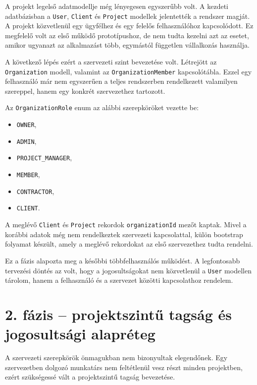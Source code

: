 \documentclass[11pt,a4paper]{report}
\begin{document}
    A projekt legelső adatmodellje még lényegesen egyszerűbb volt. A kezdeti
    adatbázisban a \texttt{User}, \texttt{Client} és \texttt{Project} modellek
    jelentették a rendszer magját. A projekt közvetlenül egy ügyfélhez és egy
    felelős felhasználóhoz kapcsolódott. Ez megfelelő volt az első működő
    prototípushoz, de nem tudta kezelni azt az esetet, amikor ugyanazt az
    alkalmazást több, egymástól független vállalkozás használja.

    A következő lépés ezért a szervezeti szint bevezetése volt. Létrejött az
    \texttt{Organization} modell, valamint az \texttt{OrganizationMember}
    kapcsolótábla. Ezzel egy felhasználó már nem egyszerűen a teljes rendszerben
    rendelkezett valamilyen szereppel, hanem egy konkrét szervezethez tartozott.

    Az \texttt{OrganizationRole} enum az alábbi szerepköröket vezette be:

    \begin{itemize}
        \item \texttt{OWNER},
        \item \texttt{ADMIN},
        \item \texttt{PROJECT\_MANAGER},
        \item \texttt{MEMBER},
        \item \texttt{CONTRACTOR},
        \item \texttt{CLIENT}.
    \end{itemize}

    A meglévő \texttt{Client} és \texttt{Project} rekordok
    \texttt{organizationId} mezőt kaptak. Mivel a korábbi adatok még nem
    rendelkeztek szervezeti kapcsolattal, külön bootstrap folyamat készült, amely a
    meglévő rekordokat az első szervezethez tudta rendelni.

    Ez a fázis alapozta meg a későbbi többfelhasználós működést. A legfontosabb
    tervezési döntés az volt, hogy a jogosultságokat nem közvetlenül a
    \texttt{User} modellen tárolom, hanem a felhasználó és a szervezet közötti
    kapcsolathoz rendelem.

    \section{2. fázis -- projektszintű tagság és jogosultsági alapréteg}

    A szervezeti szerepkörök önmagukban nem bizonyultak elegendőnek. Egy
    szervezetben dolgozó munkatárs nem feltétlenül vesz részt minden projektben,
    ezért szükségessé vált a projektszintű tagság bevezetése.
\end{document}
